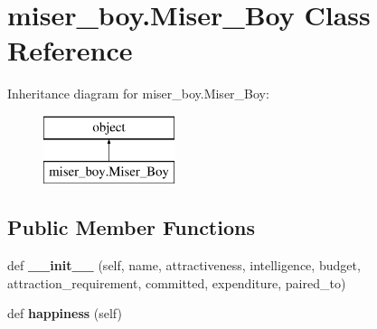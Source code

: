 \hypertarget{classmiser__boy_1_1_miser___boy}{}\section{miser\+\_\+boy.\+Miser\+\_\+\+Boy Class Reference}
\label{classmiser__boy_1_1_miser___boy}
Inheritance diagram for miser\+\_\+boy.\+Miser\+\_\+\+Boy\+:\begin{figure}[H]
\begin{center}
\leavevmode
\includegraphics[height=2.000000cm]{classmiser__boy_1_1_miser___boy}
\end{center}
\end{figure}
\subsection*{Public Member Functions}
\begin{DoxyCompactItemize}
\item 
\mbox{\label{classmiser__boy_1_1_miser___boy_a5d920fd6f24fcf5c7308e4f8e785c174}} 
def {\bfseries \+\_\+\+\_\+init\+\_\+\+\_\+} (self, name, attractiveness, intelligence, budget, attraction\+\_\+requirement, committed, expenditure, paired\+\_\+to)
\item 
\mbox{\label{classmiser__boy_1_1_miser___boy_a60d4e133633b070b0fa4ccf418c1d77b}} 
def {\bfseries happiness} (self)
\end{DoxyCompactItemize}
